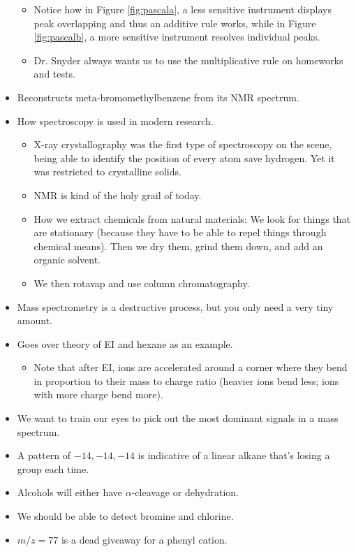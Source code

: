 \documentclass[../notes.tex]{subfiles}
\begin{document}
\begin{itemize}
\begin{itemize}
        \item Notice how in Figure \ref{fig:pascala}, a less sensitive instrument displays peak overlapping and thus an additive rule works, while in Figure \ref{fig:pascalb}, a more sensitive instrument resolves individual peaks.
        \item Dr. Snyder always wants us to use the multiplicative rule on homeworks and tests.
    \end{itemize}
    \item Reconstructs meta-bromomethylbenzene from its NMR spectrum.
    \item How spectroscopy is used in modern research.
    \begin{itemize}
        \item X-ray crystallography was the first type of spectroscopy on the scene, being able to identify the position of every atom save hydrogen. Yet it was restricted to crystalline solids.
        \item NMR is kind of the holy grail of today.
        \item How we extract chemicals from natural materials: We look for things that are stationary (because they have to be able to repel things through chemical means). Then we dry them, grind them down, and add an organic solvent.
        \item We then rotavap and use column chromatography.
    \end{itemize}
    \item Mass spectrometry is a destructive process, but you only need a very tiny amount.
    \item Goes over theory of EI and hexane as an example.
    \begin{itemize}
        \item Note that after EI, ions are accelerated around a corner where they bend in proportion to their mass to charge ratio (heavier ions bend less; ions with more charge bend more).
    \end{itemize}
    \item We want to train our eyes to pick out the most dominant signals in a mass spectrum.
    \item A pattern of $-14,-14,-14$ is indicative of a linear alkane that's losing a  group each time.
    \item Alcohols will either have $\alpha$-cleavage or dehydration.
    \item We should be able to detect bromine and chlorine.
    \item $m/z=77$ is a dead giveaway for a phenyl cation.

\end{itemize}
\end{document}
